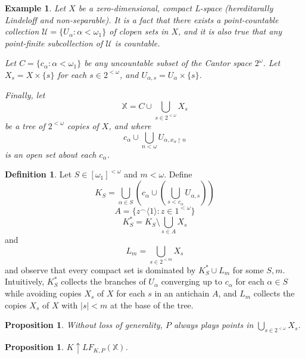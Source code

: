 \documentclass[11pt]{article}
\theoremstyle{plain}
\newtheorem{proposition}[theorem]{Proposition}
\newtheorem{example}[theorem]{Example}
\theoremstyle{definition}
\newtheorem{definition}[theorem]{Definition}
\theoremstyle{remark}
\newcommand{\win}{\uparrow}
\newcommand{\lfkpgame}[1]{LF_{K,P}(#1)}
\newcommand{\<}{\langle}
\renewcommand{\>}{\rangle}
\begin{document}
\begin{example}
Let $X$ be a zero-dimensional, compact L-space (hereditarally Lindeloff and non-separable). It is a fact that there exists a point-countable collection $\mathcal{U}=\{U_\alpha : \alpha<\omega_1\}$ of clopen sets in $X$, and it is also true that any point-finite subcollection of $\mathcal{U}$ is countable. %

Let $C = \{c_\alpha : \alpha <\omega_1\}$ be any uncountable subset of the Cantor space $2^\omega$. Let $X_s = X \times \{s\}$ for each $s \in 2^{<\omega}$, and $U_{\alpha,s} = U_\alpha \times \{s\}$.

Finally, let \[\mathbb{X} = C \cup \bigcup_{s\in 2^{<\omega}} X_s\] be a tree of $2^{<\omega}$ copies of $X$, and where \[c_\alpha \cup \bigcup_{n < \omega} U_{\alpha, x_\alpha \restriction n}\] is an open set about each $c_\alpha$.
\end{example}



\begin{definition}
Let $S\in[\omega_1]^{<\omega}$ and $m<\omega$. Define 
    \[K_S = \bigcup_{\alpha \in S} \left( c_\alpha \cup \left(\bigcup_{s < c_\alpha} U_{\alpha,s}\right)\right)\] 
    \[ A = \{z^\frown \<1\> : z \in 1^{<\omega}\}\] 
    \[ K^*_S = K_S \setminus \bigcup_{s \in A} X_s \] 
and 
    \[L_m = \bigcup_{s \in 2^{<m}} X_s\] 
and observe that every compact set is dominated by $K^*_S \cup L_m$ for some $S,m$. Intuitively, $K^*_S$ collects the branches of $U_\alpha$ converging up to $c_\alpha$ for each $\alpha \in S$ while avoiding copies $X_s$ of $X$ for each $s$ in an antichain $A$, and $L_m$ collects the copies $X_s$ of $X$ with $|s| < m$ at the base of the tree.
\end{definition}

\begin{proposition}
Without loss of generality, $P$ always plays points in $\bigcup_{s \in 2^{<\omega}} X_s$.
\end{proposition}

\begin{proposition}
$K \win \lfkpgame{\mathbb{X}}$.
\end{proposition}
\end{document}
